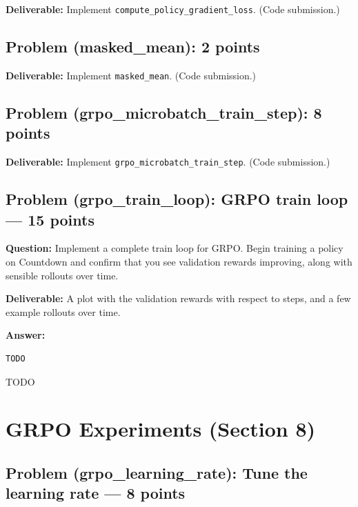 \documentclass[11pt]{article}
\begin{document}
\textbf{Deliverable:} Implement \texttt{compute\_policy\_gradient\_loss}. (Code submission.)

\subsection*{Problem (masked\_mean): 2 points}

\textbf{Deliverable:} Implement \texttt{masked\_mean}. (Code submission.)

\subsection*{Problem (grpo\_microbatch\_train\_step): 8 points}

\textbf{Deliverable:} Implement \texttt{grpo\_microbatch\_train\_step}. (Code submission.)

\subsection*{Problem (grpo\_train\_loop): GRPO train loop --- 15 points}

\textbf{Question:} Implement a complete train loop for GRPO. Begin training a policy on Countdown and confirm that you see validation rewards improving, along with sensible rollouts over time.

\textbf{Deliverable:} A plot with the validation rewards with respect to steps, and a few example rollouts over time.

\textbf{Answer:}


\begin{lstlisting}
TODO
\end{lstlisting}

TODO


\section{GRPO Experiments (Section 8)}

\subsection*{Problem (grpo\_learning\_rate): Tune the learning rate --- 8 points}
\end{document}
